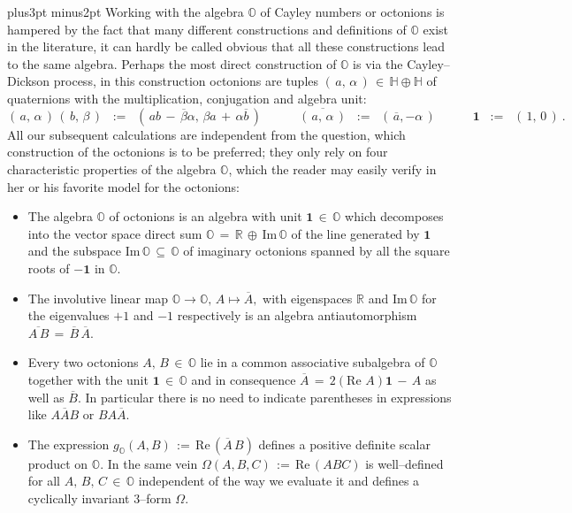 \documentclass[12pt]{article}
\def\1{\mathbf{1}}
\def\H{\mathbb{H}}
\def\O{\mathbb{O}}
\def\pfill{\vskip6pt plus3pt minus2pt\noindent}
\def\R{\mathbb{R}}
\def\Re{\mathrm{Re}\,}
\begin{document}
 \pfill
 Working with the algebra $\O$ of Cayley numbers or octonions is hampered
 by the fact that many different constructions and definitions of $\O$
 exist in the literature, it can hardly be called obvious that all these
 constructions lead to the same algebra. Perhaps the most direct construction
 of $\O$ is via the Cayley--Dickson process, in this construction octonions
 are tuples $(\,a,\,\alpha\,)\,\in\,\H\oplus\H$ of quaternions with the
 multiplication, conjugation and algebra unit:
 $$
  (\,a,\,\alpha\,)\,(\,b,\,\beta\,)
  \;\;:=\;\;
  (\,ab\,-\,\overline\beta\alpha,\,\beta a\,+\,\alpha\overline b\,)
  \qquad\quad
  \overline{(\,a,\,\alpha\,)}
  \;\;:=\;\;
  (\,\overline a,-\alpha\,)
  \qquad\quad
  \1
  \;\;:=\;\;
  (\,1,\,0\,)\ .
 $$
 All our subsequent calculations are independent from the question, which
 construction of the octonions is to be preferred; they only rely on four
 characteristic properties of the algebra $\O$, which the reader may easily
 verify in her or his favorite model for the octonions:
 \begin{itemize}
  \item The algebra $\O$ of octonions is an algebra with unit $\1\,\in\,\O$
        which decomposes into the vector space direct sum $\O\,=\,\R\,\oplus
        \,\mathrm{Im}\,\O$ of the line generated by $\1$ and the subspace
        $\mathrm{Im}\,\O\,\subseteq\,\O$ of imaginary octonions spanned by
        all the square roots of $-\1$ in $\O$.
  \item The involutive linear map $\O\longrightarrow\O,\,A\longmapsto
        \overline{A},$ with eigenspaces $\R$ and $\mathrm{Im}\,\O$
        for the eigenvalues $+1$ and $-1$ respectively is an algebra
        antiautomorphism $\overline{A\,B}\,=\,\overline B\,\overline A$.
  \item Every two octonions $A,\,B\,\in\,\O$ lie in a common associative
        subalgebra of $\O$ together with the unit $\1\,\in\,\O$ and in
        consequence $\overline A\,=\,2(\Re\,A)\1\,-\,A$ as well as
        $\overline B$. In particular there is no need to indicate
        parentheses in expressions like $A\overline AB$ or $BA\overline{A}$.
  \item The expression $g_\O(A,B)\,:=\,\Re(\overline A\,B)$ defines a positive
        definite scalar product on $\O$. In the same vein $\Omega(A,B,C)
        \,:=\,\Re(ABC)$ is well--defined for all $A,\,B,\,C\,\in\,\O$
        independent of the way we evaluate it and defines a cyclically
        invariant $3$--form $\Omega$.
 \end{itemize}
\end{document}
